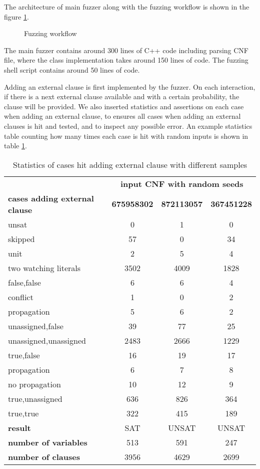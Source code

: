 The architecture of main fuzzer along with the fuzzing workflow is shown in the figure \ref{fig:fuzzer}.

\begin{figure}[h!]
  \centering
  
  \caption{Fuzzing workflow}
  \label{fig:fuzzer}
\end{figure}

The main fuzzer contains around 300 lines of C++ code including parsing CNF file, where the  class implementation takes around 150 lines of code. The fuzzing shell script contains around 50 lines of code.

Adding an external clause is first implemented by the fuzzer. On each interaction, if there is a next external clause available and with a certain probability, the clause will be provided. We also inserted statistics and assertions on each case when adding an external clause, to ensures all cases when adding an external clauses is hit and tested, and to inspect any possible error. An example statistics table counting how many times each case is hit with random inputs is shown in table \ref{tab:stats}.

\begin{table}[h!]
  \centering
  \begin{tabular}{|l|c|c|c|}
    \hline
    & \multicolumn{3}{c|}{\textbf{input CNF with random seeds}} \\
    \cline{2-4}
    \textbf{cases adding external clause} & \textbf{675958302} & \textbf{872113057} & \textbf{367451228} \\
    \hline
    unsat & 0 & 1 & 0 \\
    skipped & 57 & 0 & 34 \\
    unit & 2 & 5 & 4 \\
    two watching literals & 3502 & 4009 & 1828 \\
    \quad false,false & 6 & 6 & 4 \\
    \quad\quad conflict & 1 & 0 & 2 \\
    \quad\quad propagation & 5 & 6 & 2 \\
    \quad unassigned,false & 39 & 77 & 25 \\
    \quad unassigned,unassigned & 2483 & 2666 & 1229 \\
    \quad true,false & 16 & 19 & 17 \\
    \quad\quad propagation & 6 & 7 & 8 \\
    \quad\quad no propagation & 10 & 12 & 9 \\
    \quad true,unassigned & 636 & 826 & 364 \\
    \quad true,true & 322 & 415 & 189 \\
    \hline
    \textbf{result} & SAT & UNSAT & UNSAT \\
    \textbf{number of variables} & 513 & 591 & 247 \\
    \textbf{number of clauses} & 3956 & 4629 & 2699 \\
    \hline
  \end{tabular}
  \caption{Statistics of cases hit adding external clause with different samples}
  \label{tab:stats}
\end{table}

